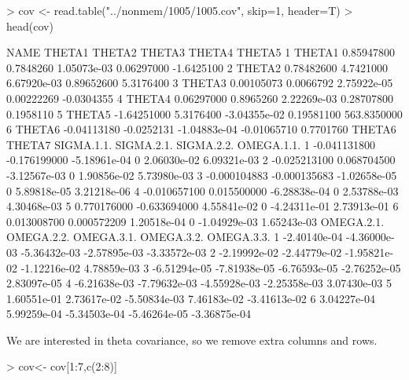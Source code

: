 \begin{Schunk}
\begin{Sinput}
> cov <- read.table("../nonmem/1005/1005.cov", skip=1, header=T)
> head(cov)
\end{Sinput}
\begin{Soutput}
    NAME      THETA1     THETA2       THETA3      THETA4      THETA5
1 THETA1  0.85947800  0.7848260  1.05073e-03  0.06297000  -1.6425100
2 THETA2  0.78482600  4.7421000  6.67920e-03  0.89652600   5.3176400
3 THETA3  0.00105073  0.0066792  2.75922e-05  0.00222269  -0.0304355
4 THETA4  0.06297000  0.8965260  2.22269e-03  0.28707800   0.1958110
5 THETA5 -1.64251000  5.3176400 -3.04355e-02  0.19581100 563.8350000
6 THETA6 -0.04113180 -0.0252131 -1.04883e-04 -0.01065710   0.7701760
        THETA6       THETA7   SIGMA.1.1. SIGMA.2.1.   SIGMA.2.2.  OMEGA.1.1.
1 -0.041131800 -0.176199000 -5.18961e-04          0  2.06030e-02 6.09321e-03
2 -0.025213100  0.068704500 -3.12567e-03          0  1.90856e-02 5.73980e-03
3 -0.000104883 -0.000135683 -1.02658e-05          0  5.89818e-05 3.21218e-06
4 -0.010657100  0.015500000 -6.28838e-04          0  2.53788e-03 4.30468e-03
5  0.770176000 -0.633694000  4.55841e-02          0 -4.24311e-01 2.73913e-01
6  0.013008700  0.000572209  1.20518e-04          0 -1.04929e-03 1.65243e-03
    OMEGA.2.1.   OMEGA.2.2.   OMEGA.3.1.   OMEGA.3.2.   OMEGA.3.3.
1 -2.40140e-04 -4.36000e-03 -5.36432e-03 -2.57895e-03 -3.33572e-03
2 -2.19992e-02 -2.44779e-02 -1.95821e-02 -1.12216e-02  4.78859e-03
3 -6.51294e-05 -7.81938e-05 -6.76593e-05 -2.76252e-05  2.83097e-05
4 -6.21638e-03 -7.79632e-03 -4.55928e-03 -2.25358e-03  3.07430e-03
5  1.60551e-01  2.73617e-02 -5.50834e-03  7.46183e-02 -3.41613e-02
6  3.04227e-04  5.99259e-04 -5.34503e-04 -5.46264e-05 -3.36875e-04
\end{Soutput}
\end{Schunk}
We are interested in theta covariance, so we remove extra columns and rows.
\begin{Schunk}
\begin{Sinput}
> cov<- cov[1:7,c(2:8)]
\end{Sinput}
\end{Schunk}
